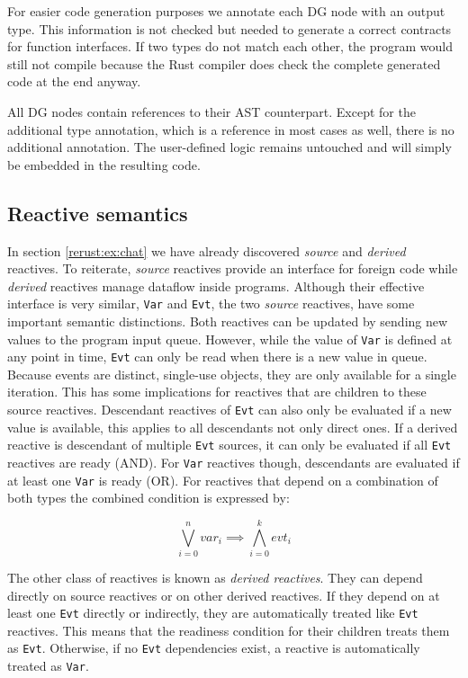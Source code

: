 For easier code generation purposes we annotate each \ac{DG} node with an output type. This information is not checked but needed to generate a correct contracts for function interfaces. If two types do not match each other, the program would still not compile because the Rust compiler does check the complete generated code at the end anyway.

All \ac{DG} nodes contain references to their \ac{AST} counterpart. Except for the additional type annotation, which is a reference in most cases as well, there is no additional annotation. The user-defined logic remains untouched and will simply be embedded in the resulting code.

\subsection{Reactive semantics}
In section \ref{rerust:ex:chat} we have already discovered \emph{source} and \emph{derived} reactives. To reiterate, \emph{source} reactives provide an interface for foreign code while \emph{derived} reactives manage dataflow inside \rerust programs. Although their effective interface is very similar, \lstinline{Var} and \lstinline{Evt}, the two \emph{source} reactives, have some important semantic distinctions. Both reactives can be updated by sending new values to the program input queue. However, while the value of \lstinline{Var} is defined at any point in time, \lstinline{Evt} can only be read when there is a new value in queue. Because events are distinct, single-use objects, they are only available for a single iteration. This has some implications for reactives that are children to these source reactives. Descendant reactives of \lstinline{Evt} can also only be evaluated if a new value is available, this applies to all descendants not only direct ones. If a derived reactive is descendant of multiple \lstinline{Evt} sources, it can only be evaluated if all \lstinline{Evt} reactives are ready (AND). For \lstinline{Var} reactives though, descendants are evaluated if at least one \lstinline{Var} is ready (OR). For reactives that depend on a combination of both types the combined condition is expressed by:

\begin{equation}
\label{eq:condition}
\bigvee_{i=0}^n var_i \implies \bigwedge_{i=0}^k evt_i
\end{equation}

The other class of reactives is known as \emph{derived reactives}. They can depend directly on source reactives or on other derived reactives. If they depend on at least one \lstinline{Evt} directly or indirectly, they are automatically treated like \lstinline{Evt} reactives. This means that the readiness condition for their children treats them as \lstinline{Evt}. Otherwise, if no \lstinline{Evt} dependencies exist, a reactive is automatically treated as \lstinline{Var}.


